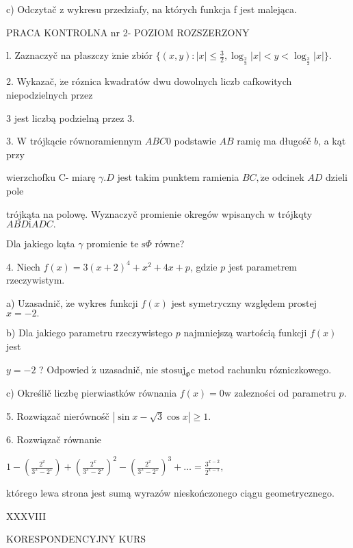 \documentclass[a4paper,12pt]{article}
\begin{document}
c) Odczytač z wykresu przedziafy, na których funkcja f jest malejąca.





PRACA KONTROLNA nr 2- POZIOM ROZSZERZONY

l. Zaznaczyč na płaszczy $\acute{\mathrm{z}}\mathrm{n}\mathrm{i}\mathrm{e}$ zbiór $\displaystyle \{(x,y):|x|\leq\frac{3}{2},\log_{\frac{2}{3}}|x|<y<\log_{\frac{3}{2}}|x|\}.$

2. Wykazač, $\dot{\mathrm{z}}\mathrm{e}$ róznica kwadratów dwu dowolnych liczb cafkowitych niepodzielnych przez

3 jest liczbą podzielną przez 3.

3. $\mathrm{W}$ trójkącie równoramiennym $ABC0$ podstawie $AB$ ramię ma długośč $b$, a kąt przy

wierzchofku C- miarę $\gamma. D$ jest takim punktem ramienia $BC, \dot{\mathrm{z}}\mathrm{e}$ odcinek $AD$ dzieli pole

trójkąta na polowę. Wyznaczyč promienie okregów wpisanych $\mathrm{w}$ trójkqty $ABD\mathrm{i}ADC.$

Dla jakiego kąta $\gamma$ promienie te $\mathrm{s}\Phi$ równe?

4. Niech $f(x)=3(x+2)^{4}+x^{2}+4x+p$, gdzie $p$ jest parametrem rzeczywistym.

a) Uzasadnič, $\dot{\mathrm{z}}\mathrm{e}$ wykres funkcji $f(x)$ jest symetryczny względem prostej $x=-2.$

b) Dla jakiego parametru rzeczywistego $p$ najmniejszą wartością funkcji $f(x)$ jest

$y=-2$ ? Odpowied $\acute{\mathrm{z}}$ uzasadnič, nie $\mathrm{s}\mathrm{t}\mathrm{o}\mathrm{s}\mathrm{u}\mathrm{j}_{\Phi}\mathrm{c}$ metod rachunku rózniczkowego.

c) Określič liczbę pierwiastków równania $f(x)=0\mathrm{w}$ zalezności od parametru $p.$

5. Rozwiązač nierównośč $|\sin x-\sqrt{3}\cos x|\geq 1.$

6. Rozwiązač równanie

$1-(\displaystyle \frac{2^{x}}{3^{x}-2^{x}})+(\frac{2^{x}}{3^{x}-2^{x}})^{2}-(\frac{2^{x}}{3^{x}-2^{x}})^{3}+\ldots=\frac{3^{x-2}}{2^{x-1}},$

którego lewa strona jest sumą wyrazów nieskończonego ciągu geometrycznego.





XXXVIII

KORESPONDENCYJNY KURS
\end{document}
